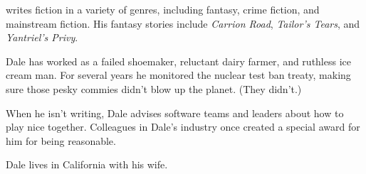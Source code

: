 
\bigskip
{}
writes fiction in a variety of genres,
including fantasy, crime fiction, and mainstream fiction.
His fantasy stories include
\emph{Carrion Road},
\emph{Tailor's Tears},
and \emph{Yantriel's Privy}.

Dale has worked as a failed shoemaker,
reluctant dairy farmer,
and ruthless ice cream man.
For several years
he monitored the nuclear test ban treaty,
making sure those pesky commies didn't blow up the planet.
(They didn't.)

When he isn't writing,
Dale advises software teams and leaders
about how to play nice together.
Colleagues in Dale's industry
once created a special award for him
for being reasonable.

Dale lives in California with his wife.
